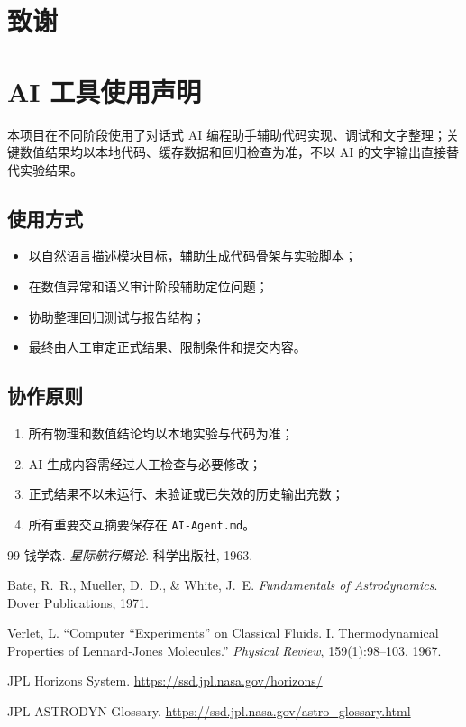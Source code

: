 \documentclass[12pt,a4paper]{ctexart}
\begin{document}
\newpage
\clearpage
{}

\section*{致谢}
\begingroup
\normalsize
{}

\endgroup

\newpage
{}

\section*{AI 工具使用声明}
本项目在不同阶段使用了对话式 AI 编程助手辅助代码实现、调试和文字整理；关键数值结果均以本地代码、缓存数据和回归检查为准，不以 AI 的文字输出直接替代实验结果。

\subsection{使用方式}
\begin{itemize}
    \item 以自然语言描述模块目标，辅助生成代码骨架与实验脚本；
    \item 在数值异常和语义审计阶段辅助定位问题；
    \item 协助整理回归测试与报告结构；
    \item 最终由人工审定正式结果、限制条件和提交内容。
\end{itemize}

\subsection{协作原则}
\begin{enumerate}
    \item 所有物理和数值结论均以本地实验与代码为准；
    \item AI 生成内容需经过人工检查与必要修改；
    \item 正式结果不以未运行、未验证或已失效的历史输出充数；
    \item 所有重要交互摘要保存在 \texttt{AI-Agent.md}。
\end{enumerate}

\newpage

\begin{thebibliography}{99}
钱学森. \textit{星际航行概论}. 科学出版社, 1963.

Bate, R.~R., Mueller, D.~D., \& White, J.~E. \textit{Fundamentals of Astrodynamics}. Dover Publications, 1971.

Verlet, L. ``Computer ``Experiments'' on Classical Fluids. I. Thermodynamical Properties of Lennard-Jones Molecules.'' \textit{Physical Review}, 159(1):98--103, 1967.

JPL Horizons System. \url{https://ssd.jpl.nasa.gov/horizons/}

JPL ASTRODYN Glossary. \url{https://ssd.jpl.nasa.gov/astro_glossary.html}
\end{thebibliography}
\end{document}
